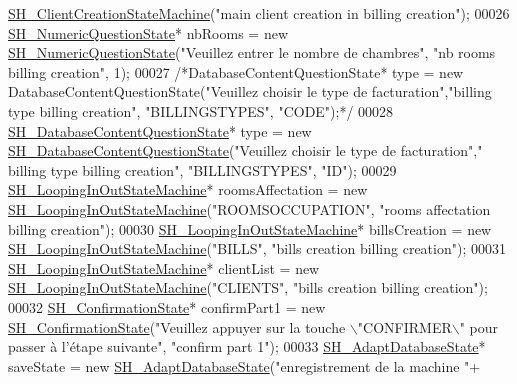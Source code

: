 \begin{DoxyCode}
      \hyperlink{classSH__ClientCreationStateMachine}{SH\_ClientCreationStateMachine}(\textcolor{stringliteral}{"main client creation in billing creation"});
00026     \hyperlink{classSH__NumericQuestionState}{SH\_NumericQuestionState}* nbRooms = \textcolor{keyword}{new} 
      \hyperlink{classSH__NumericQuestionState}{SH\_NumericQuestionState}(\textcolor{stringliteral}{"Veuillez entrer le nombre de chambres"}, \textcolor{stringliteral}{"nb rooms billing
       creation"}, 1);
00027     \textcolor{comment}{/*DatabaseContentQuestionState* type = new DatabaseContentQuestionState("Veuillez choisir le type de
       facturation","billing type billing creation", "BILLINGSTYPES", "CODE");*/}
00028     \hyperlink{classSH__DatabaseContentQuestionState}{SH\_DatabaseContentQuestionState}* type = \textcolor{keyword}{new} 
      \hyperlink{classSH__DatabaseContentQuestionState}{SH\_DatabaseContentQuestionState}(\textcolor{stringliteral}{"Veuillez choisir le type de facturation"},\textcolor{stringliteral}{"
      billing type billing creation"}, \textcolor{stringliteral}{"BILLINGSTYPES"}, \textcolor{stringliteral}{"ID"});
00029     \hyperlink{classSH__LoopingInOutStateMachine}{SH\_LoopingInOutStateMachine}* roomsAffectation = \textcolor{keyword}{new} 
      \hyperlink{classSH__LoopingInOutStateMachine}{SH\_LoopingInOutStateMachine}(\textcolor{stringliteral}{"ROOMSOCCUPATION"}, \textcolor{stringliteral}{"rooms affectation billing
       creation"});
00030     \hyperlink{classSH__LoopingInOutStateMachine}{SH\_LoopingInOutStateMachine}* billsCreation = \textcolor{keyword}{new} 
      \hyperlink{classSH__LoopingInOutStateMachine}{SH\_LoopingInOutStateMachine}(\textcolor{stringliteral}{"BILLS"}, \textcolor{stringliteral}{"bills creation billing creation"});
00031     \hyperlink{classSH__LoopingInOutStateMachine}{SH\_LoopingInOutStateMachine}* clientList = \textcolor{keyword}{new} 
      \hyperlink{classSH__LoopingInOutStateMachine}{SH\_LoopingInOutStateMachine}(\textcolor{stringliteral}{"CLIENTS"}, \textcolor{stringliteral}{"bills creation billing creation"});
00032     \hyperlink{classSH__ConfirmationState}{SH\_ConfirmationState}* confirmPart1 = \textcolor{keyword}{new} 
      \hyperlink{classSH__ConfirmationState}{SH\_ConfirmationState}(\textcolor{stringliteral}{"Veuillez appuyer sur la touche \(\backslash\)"CONFIRMER\(\backslash\)" pour passer à
       l'étape suivante"}, \textcolor{stringliteral}{"confirm part 1"});
00033     \hyperlink{classSH__AdaptDatabaseState}{SH\_AdaptDatabaseState}* saveState = \textcolor{keyword}{new} 
      \hyperlink{classSH__AdaptDatabaseState}{SH\_AdaptDatabaseState}(\textcolor{stringliteral}{"enregistrement de la machine "}+

\end{DoxyCode}

